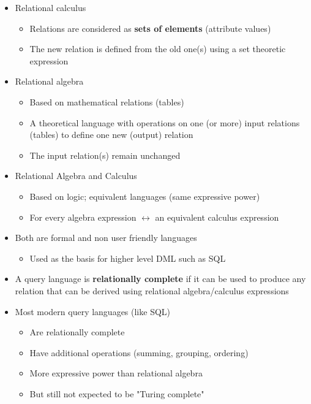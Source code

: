 \documentclass{article}[18pt]
\begin{document}
\begin{itemize}
	\item Relational calculus
	\begin{itemize}
		\item Relations are considered as \textbf{sets of elements} (attribute values)
		\item The new relation is defined from the old one(s) using a set theoretic expression
	\end{itemize}
	\item Relational algebra
	\begin{itemize}
		\item Based on mathematical relations (tables)
		\item A theoretical language with operations on one (or more) input relations (tables) to define one new (output) relation
		\item The input relation(s) remain unchanged
	\end{itemize}
	\item Relational Algebra and Calculus
	\begin{itemize}
		\item Based on logic; equivalent languages (same expressive power)
		\item For every algebra expression $\leftrightarrow$ an equivalent calculus expression
	\end{itemize}
	\item Both are formal and non user friendly languages
	\begin{itemize}
		\item Used as the basis for higher level DML such as SQL
	\end{itemize}
	\item A query language is \textbf{relationally complete} if it can be used to produce any relation that can be derived using relational algebra/calculus expressions
	\item Most modern query languages (like SQL)
	\begin{itemize}
		\item Are relationally complete
		\item Have additional operations (summing, grouping, ordering)
		\item More expressive power than relational algebra
		\item But still not expected to be "Turing complete"
	\end{itemize}
\end{itemize}
\end{document}
